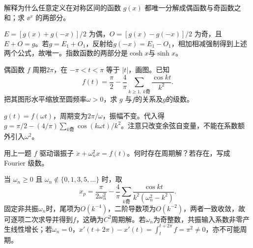 \begin{exercise}\label{cw:rec14-5}
解释为什么任意定义在对称区间的函数 $g(x)$ 都唯一分解成偶函数与奇函数之和；求 $\ee^x$ 的两部分。
\end{exercise}
\begin{solution}
$E=[g(x)+g(-x)]/2$ 为偶，$O=[g(x)-g(-x)]/2$ 为奇，且$E+O=g$。若$g=E_1+O_1$，反射给$g(-x)=E_1-O_1$，相加相减强制得到上述两个公式，故唯一。指数函数的两部分是$\cosh x$与$\sinh x$。
\par{}
\end{solution}

\begin{exercise}\label{cw:rec15-1}
偶函数 $f$ 周期$2\pi$，在 $-\pi<t<\pi$ 等于 $|t|$，画图。已知
\[f(t)=\frac\pi2-\frac4\pi\sum_{k\ge1,\ k\text{奇}}\frac{\cos kt}{k^2}.\]
把其图形水平缩放至圆频率$\omega>0$，求 $g$ 与$f$的关系及$g$的级数。
\end{exercise}
\begin{solution}
$g(t)=f(\omega t)$，周期变为$2\pi/\omega$，振幅不变。代入得 $g=\pi/2-(4/\pi)\sum_{k\text{奇}}\cos(k\omega t)/k^2$。注意只改变余弦自变量，不能在系数额外引入$\omega^2$。\begin{center}\end{center}
\par{}
\end{solution}

\begin{exercise}\label{cw:rec15-2}
用上一题 $f$ 驱动谐振子 $\ddot x+\omega_n^2x=f(t)$。何时存在周期解？若存在，写成 Fourier 级数。
\end{exercise}
\begin{solution}
当 $\omega_n\ge0$ 且 $\omega_n\notin\{0,1,3,5,\ldots\}$ 时，取
\[x_p=\frac\pi{2\omega_n^2}-\frac4\pi\sum_{k\text{奇}}\frac{\cos kt}{k^2(\omega_n^2-k^2)}.\]
固定非共振$\omega_n$时，尾项为$O(k^{-4})$，二阶导数项为$O(k^{-2})$，两者一致收敛，故可逐项二次求导并得到$f$，这确为$C^2$周期解。若$\omega_n$为奇整数，共振输入系数非零产生线性增长；若$\omega_n=0$，$x'(t+2\pi)-x'(t)=\int_t^{t+2\pi}f=\pi^2\ne0$，亦不可能周期。
\par{}
\end{solution}

